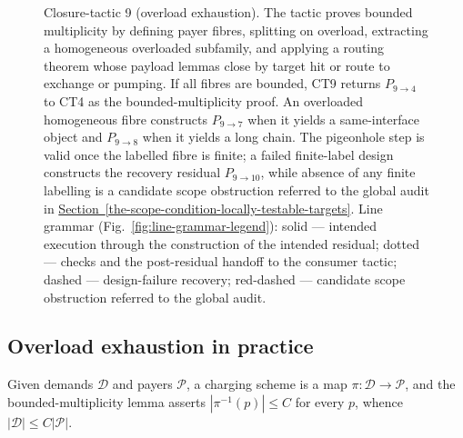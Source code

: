\documentclass[
  11pt,
]{article}
\theoremstyle{definition}
\newcommand{\secref}[1]{\hyperref[#1]{Section~\ref*{#1}}}
\begin{document}
\begin{figure}[p]
{%
}
\caption[Closure-tactic 9: overload exhaustion]{Closure-tactic 9 (overload exhaustion).  The tactic proves bounded multiplicity by defining payer fibres, splitting on overload, extracting a homogeneous overloaded subfamily, and applying a routing theorem whose payload lemmas close by target hit or route to exchange or pumping.  If all fibres are bounded, CT9 returns \(P_{9\to4}\) to CT4 as the bounded-multiplicity proof.  An overloaded homogeneous fibre constructs \(P_{9\to7}\) when it yields a same-interface object and \(P_{9\to8}\) when it yields a long chain.  The pigeonhole step is valid once the labelled fibre is finite; a failed finite-label design constructs the recovery residual \(P_{9\to10}\), while absence of any finite labelling is a candidate scope obstruction referred to the global audit in \secref{the-scope-condition-locally-testable-targets}.  Line grammar (Fig.~\ref{fig:line-grammar-legend}): solid --- intended execution through the construction of the intended residual; dotted --- checks and the post-residual handoff to the consumer tactic; dashed --- design-failure recovery; red-dashed --- candidate scope obstruction referred to the global audit.}
\label{fig:ct9-overload-exhaustion}
\end{figure}
\FloatBarrier

\subsection*{Overload exhaustion in practice}

Given demands \(\mathcal D\) and payers \(\mathcal P\), a charging
scheme is a map \(\pi:\mathcal D\to\mathcal P\), and the
bounded-multiplicity lemma asserts \(|\pi^{-1}(p)|\le C\) for every
\(p\), whence \(|\mathcal D|\le C|\mathcal P|\).
\end{document}
